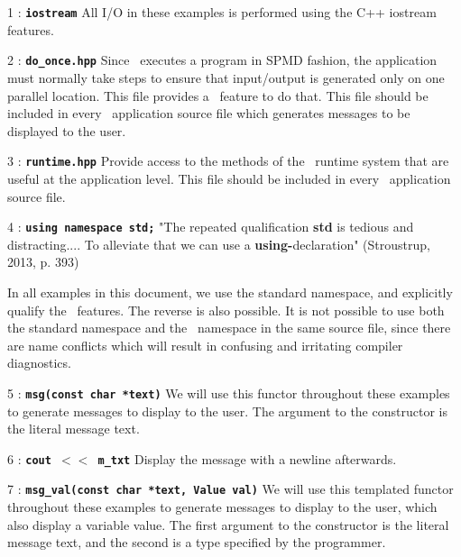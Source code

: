 \documentclass{report}
\begin{document}
\begin{hashitemize}
\item 1 : \texttt{{\bf iostream}}
\newline
All I/O in these examples is performed using the C++ iostream features.

\item 2 : \texttt{{\bf do\_once.hpp}}
\newline
Since \stapl\ executes a program in SPMD fashion, the application must
normally take steps to ensure that input/output is generated only on one
parallel location.  This file provides a \stapl\ feature to do that.
This file should be included in every \stapl\ application source file
which generates messages to be displayed to the user.

\item 3 : \texttt{{\bf runtime.hpp}}
\newline
Provide access to the methods of the \stapl\ runtime system
that are useful at the application level.
This file should be included in every \stapl\ application source file.

\item 4 : \texttt{{\bf using namespace std;}}
\newline
"The repeated qualification {\bf std} is
tedious and distracting.... To alleviate that we can use a
{\bf using-}declaration" (Stroustrup, 2013, p. 393)

In all examples in this document, we use the standard namespace, and
explicitly qualify the \stapl\ features.  The reverse is also possible.
It is not possible to use both the standard namespace and the \stapl\
namespace in the same source file, since there are name conflicts which
will result in confusing and irritating compiler diagnostics.

\item 5 : \texttt{{\bf msg(const char *text)}}
\newline
We will use this functor throughout these examples to generate messages
to display to the user.  The argument to the constructor is the literal
message text.

\item 6 : \texttt{{\bf cout $<<$ m\_txt}}
\newline
Display the message with a newline afterwards.

\item 7 : \texttt{{\bf msg\_val(const char *text, Value val)}}
\newline
We will use this templated functor throughout these examples to generate
messages to display to the user, which also display a variable value.
The first argument to the constructor is the literal message text, and
the second is a type specified by the programmer.


\end{hashitemize}
\end{document}

